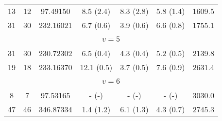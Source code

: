 \begin{table*}[htp]
\begin{tabular}{ccccccc}
 13 & 12 & 97.49150 & 8.5 (2.4) & 8.3 (2.8) & 5.8 (1.4) & 1609.5 \\
 31 & 30 & 232.16021 & 6.7 (0.6) & 3.9 (0.6) & 6.6 (0.8) & 1755.1 \\
&\vspace{-0.75em}\\
\multicolumn{7}{c}{$v = 5$} \\
\vspace{-0.75em}\\
 31 & 30 & 230.72302 & 6.5 (0.4) & 4.3 (0.4) & 5.2 (0.5) & 2139.8 \\
 19 & 18 & 233.16370 & 12.1 (0.5) & 3.7 (0.5) & 7.6 (0.9) & 2631.4 \\
&\vspace{-0.75em}\\
\multicolumn{7}{c}{$v = 6$} \\
\vspace{-0.75em}\\
 8 & 7 & 97.53165 & - (-) & - (-) & - (-) & 3030.0 \\
 47 & 46 & 346.87334 & 1.4 (1.2) & 6.1 (1.3) & 4.3 (0.7) & 2745.3 \\
\hline
\end{tabular}

\par 
\end{table*}
